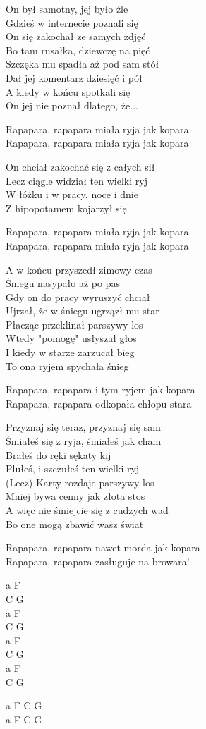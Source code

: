 \begin{text}
	On był samotny, jej było źle\\
	Gdzieś w internecie poznali się\\
	On się zakochał ze samych zdjęć\\
	Bo tam rusałka, dziewczę na pięć\\
	Szczęka mu spadła aż pod sam stół\\
	Dał jej komentarz dziesięć i pół\\
	A kiedy w końcu spotkali się\\
	On jej nie poznał dlatego, że...
	
	\vin Rapapara, rapapara miała ryja jak kopara\\
	\vin Rapapara, rapapara miała ryja jak kopara
	
	On chciał zakochać się z całych sił\\
	Lecz ciągle widział ten wielki ryj\\
	W łóżku i w pracy, noce i dnie\\
	Z hipopotamem kojarzył się
	
	\vin Rapapara, rapapara miała ryja jak kopara\\
	\vin Rapapara, rapapara miała ryja jak kopara
	
	A w końcu przyszedł zimowy czas\\
	Śniegu nasypało aż po pas\\
	Gdy on do pracy wyruszyć chciał\\
	Ujrzał, że w śniegu ugrzązł mu star\\
	Płacząc przeklinał parszywy los\\
	Wtedy "pomogę" usłyszał głos\\
	I kiedy w starze zarzucał bieg\\
	To ona ryjem spychała śnieg
	
	\vin Rapapara, rapapara i tym ryjem jak kopara\\
	\vin Rapapara, rapapara odkopała chłopu stara
	
	Przyznaj się teraz, przyznaj się sam\\
	Śmiałeś się z ryja, śmiałeś jak cham\\
	Brałeś do ręki sękaty kij\\
	Plułeś, i szczułeś ten wielki ryj\\
	(Lecz) Karty rozdaje parszywy los\\
	Mniej bywa cenny jak złota stos\\
	A więc nie śmiejcie się z cudzych wad\\
	Bo one mogą zbawić wasz świat
	
	\vin Rapapara, rapapara nawet morda jak kopara\\
	\vin Rapapara, rapapara zasługuje na browara!	
\end{text}
\begin{chord}
    a F\\
    C G\\
    a F\\
    C G\\
    a F\\
    C G\\
    a F\\
    C G

    a F C G\\
    a F C G
\end{chord}
